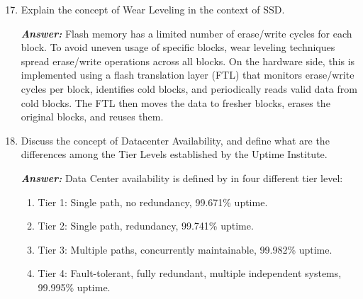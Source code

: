 \begin{enumerate}
    \setcounter{enumi}{16}
    \item Explain the concept of Wear Leveling in the context of SSD.

    \textcolor{Green3}{\textbf{\emph{Answer:}}} Flash memory has a limited number of erase/write cycles for each block. To avoid uneven usage of specific blocks, wear leveling techniques spread erase/write operations across all blocks. On the hardware side, this is implemented using a flash translation layer (FTL) that monitors erase/write cycles per block, identifies cold blocks, and periodically reads valid data from cold blocks. The FTL then moves the data to fresher blocks, erases the original blocks, and reuses them.


    \item Discuss the concept of Datacenter Availability, and define what are the differences among the Tier Levels established by the Uptime Institute.
    
    \textcolor{Green3}{\textbf{\emph{Answer:}}} Data Center availability is defined by in four different tier level:
    \begin{enumerate}
        \item Tier 1: Single path, no redundancy, 99.671\% uptime.
        \item Tier 2: Single path, redundancy, 99.741\% uptime.
        \item Tier 3: Multiple paths, concurrently maintainable, 99.982\% uptime.
        \item Tier 4: Fault-tolerant, fully redundant, multiple independent systems, 99.995\% uptime.
    \end{enumerate}
\end{enumerate}
